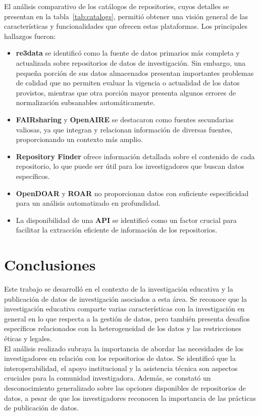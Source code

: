 \documentclass{article}
\begin{document}
El análisis comparativo de los catálogos de repositories, cuyos detalles se presentan en la tabla~\ref{tab:catalogs}, permitió obtener una visión general de las características y funcionalidades que ofrecen estas plataformas. Los principales hallazgos fueron:
\begin{itemize}
    \item \textbf{re3data} se identificó como la fuente de datos primarios más completa y actualizada sobre repositorios de datos de investigación. Sin embargo, una pequeña porción de sus datos almacenados presentan importantes problemas de calidad que no permiten evaluar la vigencia o actualidad de los datos provistos, mientras que otra porción mayor presenta algunos errores de normalización subsanables automáticamente.
    \item \textbf{FAIRsharing} y \textbf{OpenAIRE} se destacaron como fuentes secundarias valiosas, ya que integran y relacionan información de diversas fuentes, proporcionando un contexto más amplio.
    \item \textbf{Repository Finder} ofrece información detallada sobre el contenido de cada repositorio, lo que puede ser útil para los investigadores que buscan datos específicos.
    \item \textbf{OpenDOAR} y \textbf{ROAR} no proporcionan datos con suficiente especificidad para un análisis automatizado en profundidad.
    \item La disponibilidad de una \textbf{API} se identificó como un factor crucial para facilitar la extracción eficiente de información de los repositorios.
\end{itemize}

\section{Conclusiones}

Este trabajo se desarrolló en el contexto de la investigación educativa y la publicación de datos de investigación asociados a esta área. Se reconoce que la investigación educativa comparte varias características con la investigación en general en lo que respecta a la gestión de datos, pero también presenta desafíos específicos relacionados con la heterogeneidad de los datos y las restricciones éticas y legales.\\

El análisis realizado subraya la importancia de abordar las necesidades de los investigadores en relación con los repositorios de datos. Se identificó que la interoperabilidad, el apoyo institucional y la asistencia técnica son aspectos cruciales para la comunidad investigadora. Además, se constató un desconocimiento generalizado sobre las opciones disponibles de repositorios de datos, a pesar de que los investigadores reconocen la importancia de las prácticas de publicación de datos.\\
\end{document}

